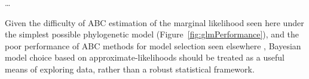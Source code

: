 \ldots

Given the difficulty of ABC estimation of the marginal likelihood seen here
under the simplest possible phylogenetic model
(Figure~\ref{fig:glmPerformance}), and the poor performance of ABC methods for
model selection seen elsewhere \citep{Robert2011,Oaks2012,Oaks2014reply},
Bayesian model choice based on approximate-likelihoods should be treated as a
useful means of exploring data, rather than a robust statistical framework.
